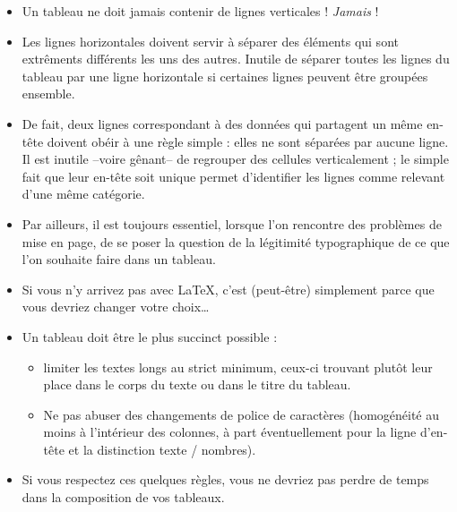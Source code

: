 \begin{itemize}
\item Un tableau ne doit jamais contenir de lignes verticales !
  \emph{Jamais} !
\item Les lignes horizontales doivent servir à séparer des éléments
  qui sont extrêments différents les uns des autres. Inutile de
  séparer toutes les lignes du tableau par une ligne horizontale si
  certaines lignes peuvent être groupées ensemble.
\item De fait, deux lignes correspondant à des données qui partagent
  un même en-tête doivent obéir à une règle simple : elles ne sont
  séparées par aucune ligne. Il est inutile --voire gênant-- de
  regrouper des cellules verticalement ; le simple fait que leur
  en-tête soit unique permet d'identifier les lignes comme relevant
  d'une même catégorie.
\item Par ailleurs, il est toujours essentiel, lorsque l'on rencontre
  des problèmes de mise en page, de se poser la question de la
  légitimité typographique de ce que l'on souhaite faire dans un
  tableau.
\item Si vous n'y arrivez pas avec \LaTeX, c'est (peut-être)
  simplement parce que vous devriez changer votre choix\ldots
\item Un tableau doit être le plus succinct possible :
  \begin{itemize}
  \item limiter les textes longs au strict minimum, ceux-ci trouvant plutôt leur
    place dans le corps du texte ou dans le titre du tableau.
  \item Ne pas abuser des changements de police de caractères
    (homogénéité au moins à l'intérieur des colonnes, à part
    éventuellement pour la ligne d'en-tête et la distinction texte /
    nombres).
  \end{itemize}
\item Si vous respectez ces quelques règles, vous ne devriez pas perdre de temps
  dans la composition de vos tableaux.
\end{itemize}

\vfill







